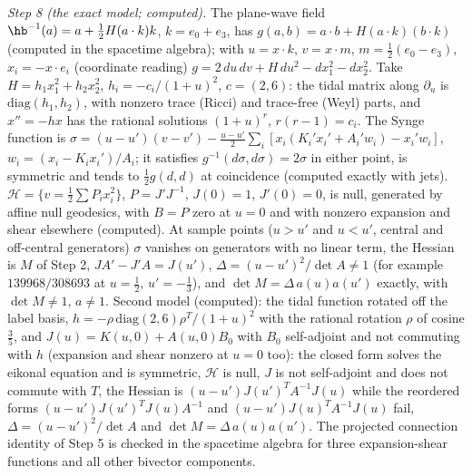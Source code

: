 \emph{Step 8 (the exact model; computed).} The plane-wave field $\hb^{-1}(a) = a + \tfrac12 H(a\cdot k)k$, $k = e_{0} + e_{3}$, has $g(a, b) = a\cdot b + H(a\cdot k)(b\cdot k)$ (computed in the spacetime algebra); with $u = x\cdot k$, $v = x\cdot m$, $m = \tfrac12(e_{0} - e_{3})$, $x_{i} = -x\cdot e_{i}$ (coordinate reading) $g = 2\,du\,dv + H\,du^{2} - dx_{1}^{2} - dx_{2}^{2}$. Take $H = h_{1}x_{1}^{2} + h_{2}x_{2}^{2}$, $h_{i} = -c_{i}/(1 + u)^{2}$, $c = (2, 6)$: the tidal matrix along $\partial_{u}$ is $\mathrm{diag}(h_{1}, h_{2})$, with nonzero trace (Ricci) and trace-free (Weyl) parts, and $x'' = -hx$ has the rational solutions $(1 + u)^{r}$, $r(r - 1) = c_{i}$. The Synge function is $\sigma = (u - u')(v - v') - \tfrac{u - u'}{2}\sum_{i}[x_{i}(K_{i}'x_{i}' + A_{i}'w_{i}) - x_{i}'w_{i}]$, $w_{i} = (x_{i} - K_{i}x_{i}')/A_{i}$; it satisfies $g^{-1}(d\sigma, d\sigma) = 2\sigma$ in either point, is symmetric and tends to $\tfrac12 g(d, d)$ at coincidence (computed exactly with jets). $\mathcal{H} = \{v = \tfrac12\sum P_{i}x_{i}^{2}\}$, $P = J'J^{-1}$, $J(0) = 1$, $J'(0) = 0$, is null, generated by affine null geodesics, with $B = P$ zero at $u = 0$ and with nonzero expansion and shear elsewhere (computed). At sample points ($u > u'$ and $u < u'$, central and off-central generators) $\sigma$ vanishes on generators with no linear term, the Hessian is $M$ of Step 2, $J A' - J'A = J(u')$, $\Delta = (u - u')^{2}/\det A \ne 1$ (for example $139968/308693$ at $u = \tfrac12$, $u' = -\tfrac13$), and $\det M = \Delta\,a(u)a(u')$ exactly, with $\det M \ne 1$, $a \ne 1$. Second model (computed): the tidal function rotated off the label basis, $h = -\rho\,\mathrm{diag}(2, 6)\rho^{T}/(1 + u)^{2}$ with the rational rotation $\rho$ of cosine $\tfrac35$, and $J(u) = K(u, 0) + A(u, 0)B_{0}$ with $B_{0}$ self-adjoint and not commuting with $h$ (expansion and shear nonzero at $u = 0$ too): the closed form solves the eikonal equation and is symmetric, $\mathcal{H}$ is null, $J$ is not self-adjoint and does not commute with $T$, the Hessian is $(u - u')J(u')^{T}A^{-1}J(u)$ while the reordered forms $(u - u')J(u')^{T}J(u)A^{-1}$ and $(u - u')J(u)^{T}A^{-1}J(u)$ fail, $\Delta = (u - u')^{2}/\det A$ and $\det M = \Delta\,a(u)a(u')$. The projected connection identity of Step 5 is checked in the spacetime algebra for three expansion-shear functions and all other bivector components.

